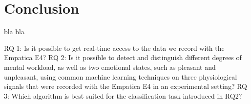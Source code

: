 

\section{Conclusion}
bla bla

RQ 1: Is it possible to get real-time access to the data we record with the Empatica E4?
RQ 2: Is it possible to detect and distinguish different degrees of mental workload, as well as two emotional states, such as pleasant and unpleasant, using common machine learning techniques on three physiological signals that were recorded with the Empatica E4 in an experimental setting?
RQ 3: Which algorithm is best suited for the classification task introduced in RQ2?


